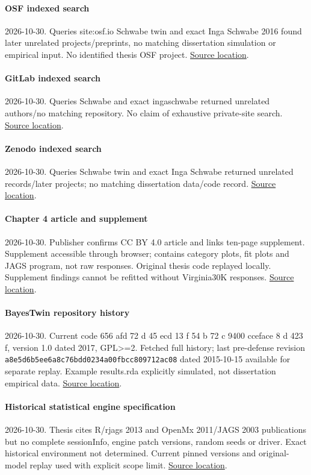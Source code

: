 \documentclass[11pt]{article}
\begin{document}
\paragraph{OSF indexed search} 2026-10-30. Queries site:osf.io Schwabe twin and exact Inga Schwabe 2016 found later unrelated projects/preprints, no matching dissertation simulation or empirical input. No identified thesis OSF project. \href{https://osf.io/}{Source location}.
\paragraph{GitLab indexed search} 2026-10-30. Queries Schwabe and exact ingaschwabe returned unrelated authors/no matching repository. No claim of exhaustive private-site search. \href{https://gitlab.com/}{Source location}.
\paragraph{Zenodo indexed search} 2026-10-30. Queries Schwabe twin and exact Inga Schwabe returned unrelated records/later projects; no matching dissertation data/code record. \href{https://zenodo.org/}{Source location}.
\paragraph{Chapter 4 article and supplement} 2026-10-30. Publisher confirms CC BY 4.0 article and links ten-page supplement. Supplement accessible through browser; contains category plots, fit plots and JAGS program, not raw responses. Original thesis code replayed locally. Supplement findings cannot be refitted without Virginia30K responses. \href{https://link.springer.com/article/10.1007/s10519-015-9768-9}{Source location}.
\paragraph{BayesTwin repository history} 2026-10-30. Current code 656 afd 72 d 45 ecd 13 f 54 b 72 c 9400 cceface 8 d 423 f, version 1.0 dated 2017, GPL>=2. Fetched full history; last pre-defense revision \nolinkurl{a8e5d6b5ee6a8c76bdd0234a00fbcc809712ac08} dated 2015-10-15 available for separate replay. Example results.rda explicitly simulated, not dissertation empirical data. \href{https://github.com/ingaschwabe/BayesTwin}{Source location}.
\paragraph{Historical statistical engine specification} 2026-10-30. Thesis cites R/rjags 2013 and OpenMx 2011/JAGS 2003 publications but no complete sessionInfo, engine patch versions, random seeds or driver. Exact historical environment not determined. Current pinned versions and original-model replay used with explicit scope limit. \href{https://github.com/ingaschwabe/Nature-Nurture-and-Item-Response-Theory}{Source location}.
\end{document}
